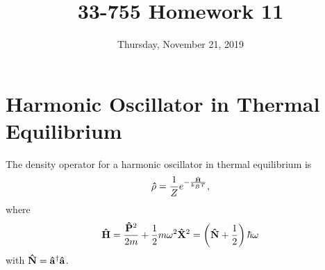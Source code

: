 \documentclass[a4paper,twoside]{article}
\title{33-755 Homework 11}
\date{Thursday, November 21, 2019}
\begin{document}
\maketitle

\section*{Harmonic Oscillator in Thermal Equilibrium}
The density operator for a harmonic oscillator in thermal equilibrium is
\begin{equation}
    \vu{\rho} = \frac{1}{Z} e^{- \frac{\vu{H}}{k_B T}},
\end{equation}
where
\begin{equation}
    \vu{H} = \frac{ \vu{P}^2}{2m} + \frac{1}{2} m \omega^2 \vu{X}^2 = \left( \vu{N} + \frac{1}{2} \right) \hbar \omega
\end{equation}
with $ \vu{N} = \vu{a}^\dagger \vu{a} $.
\end{document}
